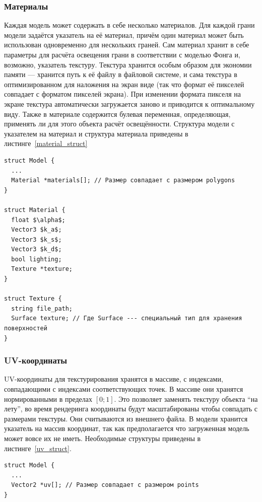 \documentclass[a4paper,12pt]{report}
\numberwithin{equation}{section}
\begin{document}
\subsubsection{Материалы}
Каждая модель может содержать в себе несколько материалов. Для каждой грани модели задаётся указатель на её материал, причём один материал может быть использован одновременно для нескольких граней. Сам материал хранит в себе параметры для расчёта освещения грани в соответствии с моделью Фонга и, возможно, указатель текстуру. Текстура хранится особым образом для экономии памяти --- хранится путь к её файлу в файловой системе, и сама текстура в оптимизированном для наложения на экран виде (так что формат её пикселей совпадает с форматом пикселей экрана). При изменении формата пикселя на экране текстура автоматически загружается заново и приводится к оптимальному виду. Также в материале содержится булевая переменная, определяющая, применять ли для этого объекта расчёт освещённости. Структура модели с указателем на материал и структура материала приведены в листинге~\ref{material_struct}

\begin{lstlisting}[float=h,caption={Структура данных ``Модель'' с добавленным полем материала и структуры ``Материал'' и ``Текстура''},label=material_struct]
struct Model {
  ...
  Material *materials[]; // Размер совпадает с размером polygons
}

struct Material {
  float $\alpha$;
  Vector3 $k_a$;
  Vector3 $k_s$;
  Vector3 $k_d$;
  bool lighting;
  Texture *texture;
}

struct Texture {
  string file_path;
  Surface texture; // Где Surface --- специальный тип для хранения поверхностей
}
\end{lstlisting}

\subsubsection{UV-координаты}
UV-координаты для текстурирования хранятся в массиве, с индексами, совпадающими с индексами соответствующих точек. В массиве они хранятся нормированными в пределах $[0;1]$. Это позволяет заменять текстуру объекта ``на лету'', во время рендеринга координаты будут масштабированы чтобы совпадать с размерами текстуры. Они считываются из внешнего файла. В модели хранится указатель на массив координат, так как предполагается что загруженная модель может вовсе их не иметь. Необходимые структуры приведены в листинге~\ref{uv_struct}.

\begin{lstlisting}[float=h,caption={Структура данных ``Модель'' с добавленным полем UV-координат},label=uv_struct]
struct Model {
  ...
  Vector2 *uv[]; // Размер совпадает с размером points
}
\end{lstlisting}
\end{document}
